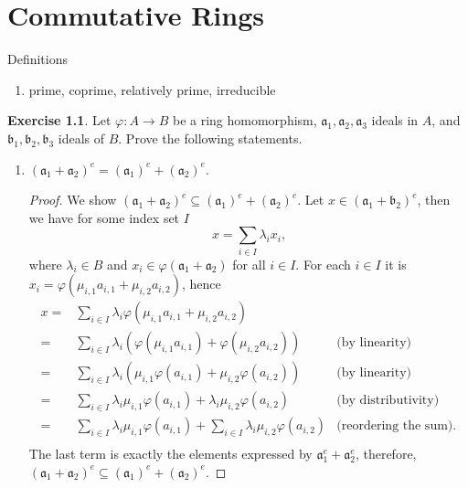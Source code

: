 \documentclass{book}
\theoremstyle{plain}
\theoremstyle{definition}
\newtheorem{exr}[thm]{Exercise}
\theoremstyle{custom_definition}
\begin{document}
%
%
%
\chapter{Commutative Rings}

Definitions
\begin{enumerate}
  \item prime, coprime, relatively prime, irreducible
\end{enumerate}


\begin{exr}
  Let \(\varphi: A \longrightarrow B\) be a ring homomorphism, \(\mathfrak{a}_1, \mathfrak{a}_2, \mathfrak{a}_3\) ideals in \(A\), and \(\mathfrak{b}_1, \mathfrak{b}_2, \mathfrak{b}_3\) ideals of \(B\). Prove the following statements.
  \begin{enumerate}
    \item \((\mathfrak{a}_1 + \mathfrak{a}_2)^e = (\mathfrak{a}_1)^e + (\mathfrak{a}_2)^e\).
    \begin{proof}
      We show \((\mathfrak{a}_1 + \mathfrak{a}_2)^e \subseteq (\mathfrak{a}_1)^e + (\mathfrak{a}_2)^e\). Let \(x \in (\mathfrak{a}_1 + \mathfrak{b}_2)^e\), then we have for some index set \(I\)
      \begin{equation}
        x = \sum_{i \in I} \lambda_i x_i \text{,}
      \end{equation}
      where \(\lambda_i \in B\) and \(x_i \in \varphi(\mathfrak{a}_1 + \mathfrak{a}_2)\) for all \(i \in I\). For each \(i \in I\) it is \(x_i = \varphi(\mu_{i, 1} a_{i, 1} + \mu_{i, 2} a_{i, 2})\), hence
      \begin{align}
        x =& \sum_{i \in I} \lambda_i \varphi(\mu_{i, 1} a_{i, 1} + \mu_{i, 2} a_{i, 2}) &  \\
        =& \sum_{i \in I} \lambda_i \left( \varphi(\mu_{i, 1} a_{i, 1}) + \varphi(\mu_{i, 2} a_{i, 2}) \right)&\text{(by linearity)} \\
        =& \sum_{i \in I} \lambda_i \left( \mu_{i, 1} \varphi( a_{i, 1}) + \mu_{i, 2} \varphi( a_{i, 2}) \right)&\text{(by linearity)} \\
        =& \sum_{i \in I} \lambda_i \mu_{i, 1}\varphi( a_{i, 1}) + \lambda_i \mu_{i, 2}\varphi( a_{i, 2}) & \text{(by distributivity)} \\
        =& \sum_{i \in I} \lambda_i \mu_{i, 1} \varphi( a_{i, 1}) + \sum_{i \in I} \lambda_i \mu_{i, 2} \varphi( a_{i, 2}) & \text{(reordering the sum)} \text{.} \\
      \end{align}
      The last term is exactly the elements expressed by \(\mathfrak{a}_1^e + \mathfrak{a}_2^e\), therefore, \((\mathfrak{a}_1 + \mathfrak{a}_2)^e \subseteq (\mathfrak{a}_1)^e + (\mathfrak{a}_2)^e\).


\end{proof}
\end{enumerate}
\end{exr}
\end{document}
